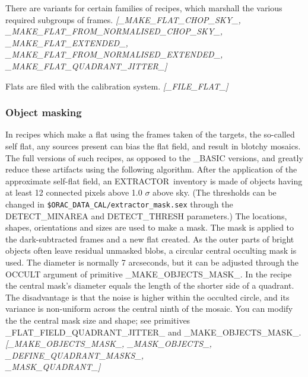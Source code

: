 \documentclass[twoside,11pt,nolof]{starlink}
\providecommand{\EXTRACTOR}{\mbox{\footnotesize EXTRACTOR}}
\begin{document}
There are variants for certain families of recipes, which marshall the
various required subgroups of frames.
\newline \emph{[\_MAKE\_FLAT\_CHOP\_SKY\_,
\_MAKE\_FLAT\_FROM\_NORMALISED\_CHOP\_SKY\_, \\
\_MAKE\_FLAT\_EXTENDED\_, \_MAKE\_FLAT\_FROM\_NORMALISED\_EXTENDED\_,\\
\_MAKE\_FLAT\_QUADRANT\_JITTER\_]}

Flats are filed with the calibration system.  \newline \emph{[\_FILE\_FLAT\_]}

\subsubsection{Object masking\label{object_masking}}

In recipes which make a flat using the frames taken of the targets,
the so-called self flat, any sources present can bias the flat field,
and result in blotchy mosaics.  The full versions of such recipes, as
opposed to the \_BASIC versions, and
 greatly reduce
these artifacts using the following algorithm.  After the application
of the approximate self-flat field, an \EXTRACTOR\ inventory is made
of objects having at least 12 connected pixels above 1.0 $\sigma$
above sky.  (The thresholds can be changed in
{\tt\$ORAC\_DATA\_CAL/extractor\_mask.sex} through the DETECT\_MINAREA
and DETECT\_THRESH parameters.) The locations, shapes, orientations and
sizes are used to make a mask. The mask is applied to the
dark-subtracted frames and a new flat created.  As the outer parts of
bright objects often leave residual unmasked blobs, a circular central
occulting mask is used. The diameter is normally 7 arcseconds, but it
can be adjusted through the OCCULT argument of primitive
\_MAKE\_OBJECTS\_MASK\_.  In the
 recipe the central mask's
diameter equals the length of the shorter side of a quadrant.  The
disadvantage is that the noise is higher within the occulted circle,
and its variance is non-uniform across the central ninth of the mosaic.
You can modify the the central mask size and shape; see primitives
\_FLAT\_FIELD\_QUADRANT\_JITTER\_ and \_MAKE\_OBJECTS\_MASK\_.
\newline \emph{[\_MAKE\_OBJECTS\_MASK\_, \_MASK\_OBJECTS\_,
\_DEFINE\_QUADRANT\_MASKS\_,\\
\_MASK\_QUADRANT\_]}
\end{document}
